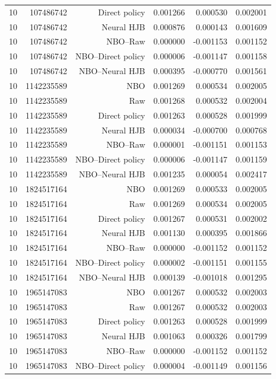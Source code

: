 \begin{longtable}{lrrrrr}
10 & 107486742 & Direct policy & 0.001266 & 0.000530 & 0.002001 \\
10 & 107486742 & Neural HJB & 0.000876 & 0.000143 & 0.001609 \\
10 & 107486742 & NBO--Raw & 0.000000 & -0.001153 & 0.001152 \\
10 & 107486742 & NBO--Direct policy & 0.000006 & -0.001147 & 0.001158 \\
10 & 107486742 & NBO--Neural HJB & 0.000395 & -0.000770 & 0.001561 \\
10 & 1142235589 & NBO & 0.001269 & 0.000534 & 0.002005 \\
10 & 1142235589 & Raw & 0.001268 & 0.000532 & 0.002004 \\
10 & 1142235589 & Direct policy & 0.001263 & 0.000528 & 0.001999 \\
10 & 1142235589 & Neural HJB & 0.000034 & -0.000700 & 0.000768 \\
10 & 1142235589 & NBO--Raw & 0.000001 & -0.001151 & 0.001153 \\
10 & 1142235589 & NBO--Direct policy & 0.000006 & -0.001147 & 0.001159 \\
10 & 1142235589 & NBO--Neural HJB & 0.001235 & 0.000054 & 0.002417 \\
10 & 1824517164 & NBO & 0.001269 & 0.000533 & 0.002005 \\
10 & 1824517164 & Raw & 0.001269 & 0.000534 & 0.002005 \\
10 & 1824517164 & Direct policy & 0.001267 & 0.000531 & 0.002002 \\
10 & 1824517164 & Neural HJB & 0.001130 & 0.000395 & 0.001866 \\
10 & 1824517164 & NBO--Raw & 0.000000 & -0.001152 & 0.001152 \\
10 & 1824517164 & NBO--Direct policy & 0.000002 & -0.001151 & 0.001155 \\
10 & 1824517164 & NBO--Neural HJB & 0.000139 & -0.001018 & 0.001295 \\
10 & 1965147083 & NBO & 0.001267 & 0.000532 & 0.002003 \\
10 & 1965147083 & Raw & 0.001267 & 0.000532 & 0.002003 \\
10 & 1965147083 & Direct policy & 0.001263 & 0.000528 & 0.001999 \\
10 & 1965147083 & Neural HJB & 0.001063 & 0.000326 & 0.001799 \\
10 & 1965147083 & NBO--Raw & 0.000000 & -0.001152 & 0.001152 \\
10 & 1965147083 & NBO--Direct policy & 0.000004 & -0.001149 & 0.001156 \\

\end{longtable}
